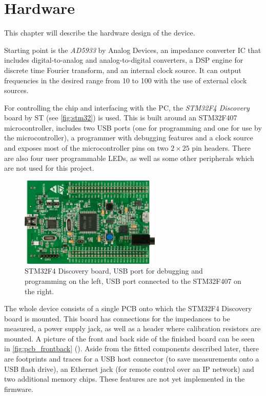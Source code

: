 \chapter{Hardware} \label{sec:hardware}

This chapter will describe the hardware design of the device.

Starting point is the \emph{AD5933} by Analog Devices, an impedance converter IC that includes digital-to-analog and
analog-to-digital converters, a DSP engine for discrete time Fourier transform, and an internal clock source. It can
output frequencies in the desired range from \unit{10}{\hertz} to \unit{100}{\kilo\hertz} with the use of external
clock sources.

For controlling the chip and interfacing with the PC, the \emph{STM32F4 Discovery} board by ST (see \autoref{fig:stm32})
is used. This is built around an STM32F407 microcontroller, includes two USB ports (one for programming and one for use
by the microcontroller), a programmer with debugging features and a clock source and exposes most of the microcontroller
pins on two $ 2 \times 25 $ pin headers. There are also four user programmable LEDs, as well as some other peripherals
which are not used for this project.

\begin{figure}[htpb]
  \centering
    \includegraphics[width=0.6\textwidth]{bilder/stm32.jpg}
  \caption[STM32F4 Discovery board.]{STM32F4 Discovery board\footnotemark{}, USB port for debugging and programming
    on the left, USB port connected to the STM32F407 on the right.}
  \label{fig:stm32}
\end{figure}

The whole device consists of a single PCB onto which the STM32F4 Discovery board is mounted. This board has connections
for the impedances to be measured, a power supply jack, as well as a header where calibration resistors are mounted.
A picture of the front and back side of the finished board can be seen in \autoref{fig:pcb_frontback}
(). Aside from the fitted components described later, there are footprints and traces
for a USB host connector (to save measurements onto a USB flash drive), an Ethernet jack (for remote control over
an IP network) and two additional memory chips. These features are not yet implemented in the firmware.


